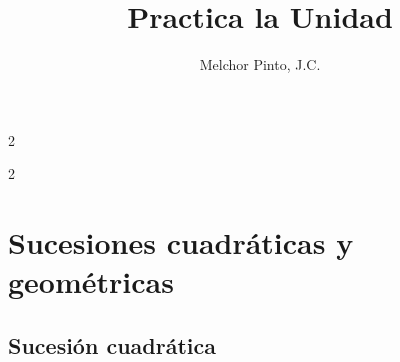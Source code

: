\documentclass[12pt,addpoints]{repaso}
\title{Practica la Unidad}
\author{Melchor Pinto, J.C.}
\begin{document}
\INFO%
\begin{multicols}{2}
	\tableofcontents
\end{multicols}
\vfill\newpage
\begin{multicols}{2}
    
    
\end{multicols}
\section{Sucesiones cuadráticas y geométricas}
\subsection{Sucesión cuadrática}
\end{document}
